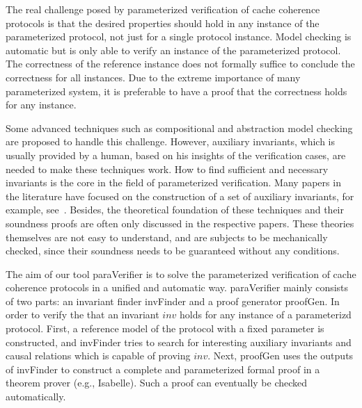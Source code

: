 \documentclass{llncs}
\begin{document}
The real challenge posed by parameterized verification of cache coherence protocols
is that the desired properties should hold in any instance of the parameterized
protocol, not just for a single protocol instance. Model checking is
automatic but is only able to verify an instance of the parameterized
protocol. The correctness of the reference instance does
not formally suffice to conclude the correctness for all instances.
Due to the extreme importance of many parameterized system, it is
preferable to have a proof that the correctness holds for any
instance.

Some advanced techniques such as compositional and abstraction model
checking are proposed to handle this challenge. However, auxiliary
invariants, which is usually provided by a human, based on his
insights of the verification cases, are needed to make these
techniques work. How to find sufficient and necessary invariants
is the core in the field of parameterized verification.
Many papers in the literature have focused on the
construction of a set of auxiliary
invariants, for example, see~\cite{Pnueli2001,Chou2004,Pandav2005,cubicle2011}.
Besides, the theoretical foundation of these techniques and their
soundness proofs are often only discussed in the respective papers.
These theories themselves are not easy to understand, and are subjects
to be mechanically checked, since their soundness needs to be
guaranteed without any conditions.

The aim of our tool {\sf paraVerifier} is to solve the parameterized
verification of cache coherence protocols in a unified and automatic way.
{\sf paraVerifier} mainly consists of two parts:  an invariant finder {\sf invFinder}
and a proof generator {\sf proofGen}. In order to verify the that an
invariant $inv$ holds for any instance of a parameterizd protocol.
First, a reference model of the protocol with a fixed parameter
is constructed, and {\sf invFinder} tries to search for
interesting auxiliary invariants and causal relations which is
capable of proving $inv$. Next, {\sf proofGen}
uses the outputs of {\sf invFinder} to construct a complete and parameterized
formal proof in a theorem prover (e.g., Isabelle). Such a proof can eventually
be checked automatically.
\end{document}
